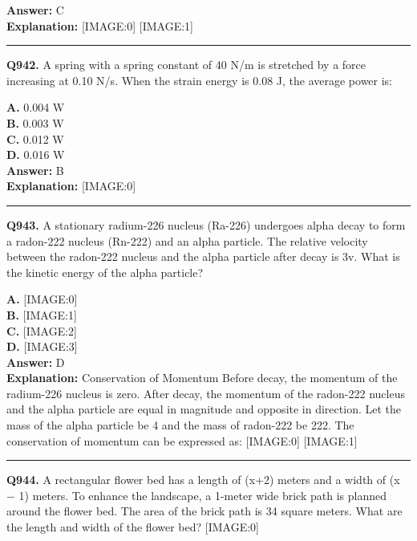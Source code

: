 \documentclass[12pt]{article}
\begin{document}
\textbf{Answer:} C \\
\textbf{Explanation:} [IMAGE:0]
[IMAGE:1]

\hrule
\vspace{1em}


\noindent
\textbf{Q942.} A spring with a spring constant of 40 N/m is stretched by a force increasing at 0.10 N/s. When the strain energy is 0.08 J, the average power is:



\textbf{A.} 0.004 W \\
\textbf{B.} 0.003 W \\
\textbf{C.} 0.012 W \\
\textbf{D.} 0.016 W \\

\textbf{Answer:} B \\
\textbf{Explanation:} [IMAGE:0]

\hrule
\vspace{1em}


\noindent
\textbf{Q943.} A stationary radium-226 nucleus (Ra-226) undergoes alpha decay to form a radon-222 nucleus (Rn-222) and an alpha particle. The relative velocity between the radon-222 nucleus and the alpha particle after decay is 3v. What is the kinetic energy of the alpha particle?



\textbf{A.} [IMAGE:0] \\
\textbf{B.} [IMAGE:1] \\
\textbf{C.} [IMAGE:2] \\
\textbf{D.} [IMAGE:3] \\

\textbf{Answer:} D \\
\textbf{Explanation:} Conservation of Momentum
Before decay, the momentum of the radium-226 nucleus is zero. After decay, the momentum of the radon-222 nucleus and the alpha particle are equal in magnitude and opposite in direction. Let the mass of the alpha particle be 4 and the mass of radon-222 be 222. The conservation of momentum can be expressed as:
[IMAGE:0]
[IMAGE:1]

\hrule
\vspace{1em}


\noindent
\textbf{Q944.} A rectangular flower bed has a length of (x+2) meters and a width of (x
−
1) meters. To enhance the landscape, a 1-meter wide brick path is planned around the flower bed. The area of the brick path is 34 square meters. What are the length and width of the flower bed?
[IMAGE:0]
\end{document}
